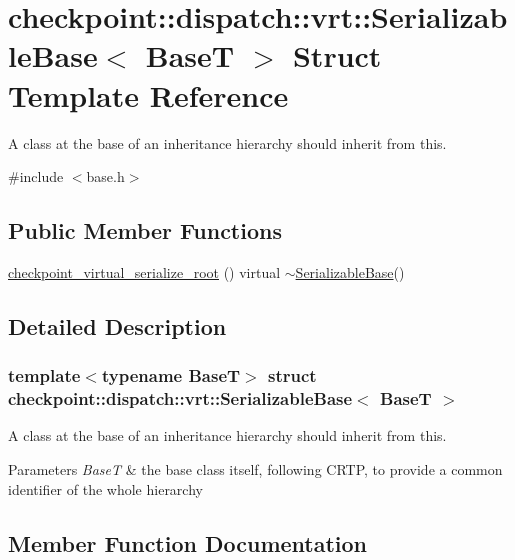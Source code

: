 \hypertarget{structcheckpoint_1_1dispatch_1_1vrt_1_1_serializable_base}{}\section{checkpoint\+:\+:dispatch\+:\+:vrt\+:\+:Serializable\+Base$<$ BaseT $>$ Struct Template Reference}
\label{structcheckpoint_1_1dispatch_1_1vrt_1_1_serializable_base}


A class at the base of an inheritance hierarchy should inherit from this.  




{\ttfamily \#include $<$base.\+h$>$}

\subsection*{Public Member Functions}
\begin{DoxyCompactItemize}
\item 
\hyperlink{structcheckpoint_1_1dispatch_1_1vrt_1_1_serializable_base_a0f2a654bfcf896a7bdf157bda7d41341}{checkpoint\+\_\+virtual\+\_\+serialize\+\_\+root} () virtual $\sim$\hyperlink{structcheckpoint_1_1dispatch_1_1vrt_1_1_serializable_base}{Serializable\+Base}()
\end{DoxyCompactItemize}


\subsection{Detailed Description}
\subsubsection*{template$<$typename BaseT$>$\newline
struct checkpoint\+::dispatch\+::vrt\+::\+Serializable\+Base$<$ Base\+T $>$}

A class at the base of an inheritance hierarchy should inherit from this. 


\begin{DoxyParams}{Parameters}
{\em BaseT} & the base class itself, following C\+R\+TP, to provide a common identifier of the whole hierarchy \\
\hline
\end{DoxyParams}


\subsection{Member Function Documentation}
\mbox{\label{structcheckpoint_1_1dispatch_1_1vrt_1_1_serializable_base_a0f2a654bfcf896a7bdf157bda7d41341}} 
